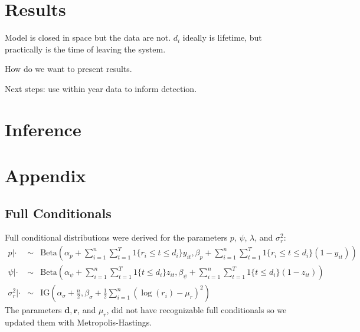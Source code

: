 \documentclass[12pt, a4paper]{article}
\begin{document}
\section{Results}

Model is closed in space but the data are not. $d_i$ ideally is lifetime, but practically is the time of leaving the system. 

How do we want to present results. 

Next steps: use within year data to inform detection.

\section{Inference}





\section{Appendix}

\subsection{Full Conditionals} 

Full conditional distributions were derived for the parameters $p$, $\psi$, $\lambda$, and $\sigma_r^2$:
\begin{eqnarray*}
p | \cdot & \sim & \text{Beta} \left( \alpha_p + \sum_{i=1}^n \sum_{t=1}^T 1 \{ r_i \leq t \leq d_i \} y_{it}, \beta_p + \sum_{i=1}^n \sum_{t=1}^T 1\{ r_i \leq t \leq d_i \} (1 - y_{it}) \right)  \\





\psi | \cdot & \sim & \text{Beta}\left( \alpha_{\psi} + \sum_{i=1}^n \sum_{t=1}^T 1\{ t \leq d_i\} z_{it}, \beta_{\psi} + \sum_{i=1}^n \sum_{t=1}^T 1\{ t \leq d_i \} (1 - z_{it}) \right) \\
\sigma_{r}^2 | \cdot & \sim & \text{IG} \left( \alpha_{\sigma} + \frac{n}{2}, \beta_{\sigma} + \frac{1}{2} \sum_{i=1}^n ( \log(r_i) - \mu_r)^2 \right)
\end{eqnarray*}
The parameters $\mathbf{d}, \mathbf{r}$, and $\mu_r$, did not have recognizable full conditionals so we updated them with Metropolis-Hastings.  
\end{document}
